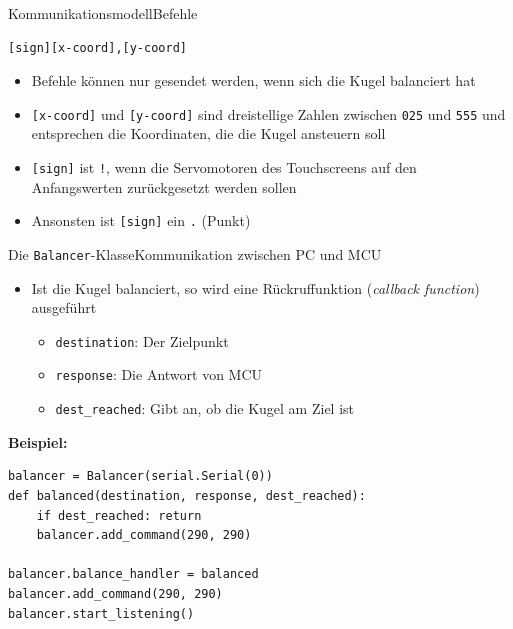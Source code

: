 \documentclass{beamer}
\begin{document}
\begin{frame}[fragile,t]{Kommunikationsmodell}{Befehle}
\begin{verbatim}
[sign][x-coord],[y-coord]
\end{verbatim}

\pause \begin{itemize}[<+->]
\item Befehle können nur gesendet werden, wenn sich die Kugel balanciert hat
\item \texttt{[x-coord]} und \texttt{[y-coord]} sind dreistellige Zahlen zwischen \texttt{025} und \texttt{555} und entsprechen die Koordinaten, die die Kugel ansteuern soll
\item \texttt{[sign]} ist \texttt{!}, wenn die Servomotoren des Touchscreens auf den Anfangswerten zurückgesetzt werden sollen
\item Ansonsten ist \texttt{[sign]} ein \texttt{.} (Punkt)
\end{itemize}
\end{frame}

\begin{frame}[fragile,t]{Die \verb~Balancer~-Klasse}{Kommunikation zwischen PC und MCU}

\begin{itemize}[<+->]
\item Ist die Kugel balanciert, so wird eine Rückruffunktion (\textit{callback function}) ausgeführt
\begin{itemize}
\item \verb+destination+: Der Zielpunkt
\item \verb+response+: Die Antwort von MCU
\item \verb+dest_reached+: Gibt an, ob die Kugel am Ziel ist
\end{itemize}
\end{itemize}

\pause\textbf{Beispiel:}

\medskip
\begin{verbatim}
balancer = Balancer(serial.Serial(0))
def balanced(destination, response, dest_reached):
    if dest_reached: return
    balancer.add_command(290, 290)

balancer.balance_handler = balanced
balancer.add_command(290, 290)
balancer.start_listening()
\end{verbatim}
\end{frame}
\end{document}

